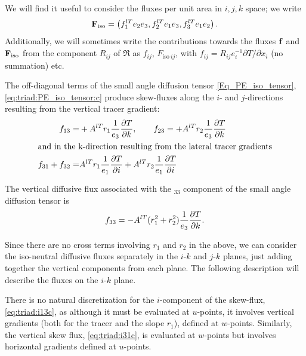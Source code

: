 We will find it useful to consider the fluxes per unit area in $i,j,k$
space; we write
\begin{equation}
  \label{eq:triad:Fijk}
  \mathbf{F}_{\mathrm{iso}}=\left(f_1^{lT}e_2e_3, f_2^{lT}e_1e_3, f_3^{lT}e_1e_2\right).
\end{equation}
Additionally, we will sometimes write the contributions towards the
fluxes $\mathbf{f}$ and $\mathbf{F}_\mathrm{iso}$ from the component
$R_{ij}$ of $\Re$ as $f_{ij}$, $F_{\mathrm{iso}\: ij}$, with
$f_{ij}=R_{ij}e_i^{-1}\partial T/\partial x_i$ (no summation) etc.

The off-diagonal terms of the small angle diffusion tensor
\eqref{Eq_PE_iso_tensor}, \eqref{eq:triad:PE_iso_tensor:c} produce skew-fluxes along the
$i$- and $j$-directions resulting from the vertical tracer gradient:
\begin{align}
  \label{eq:triad:i13c}
  f_{13}=&+{A^{lT}} r_1\frac{1}{e_3}\frac{\partial T}{\partial k},\qquad f_{23}=+{A^{lT}} r_2\frac{1}{e_3}\frac{\partial T}{\partial k}\\
\intertext{and in the k-direction resulting from the lateral tracer gradients}
  \label{eq:triad:i31c}
 f_{31}+f_{32}=& {A^{lT}} r_1\frac{1}{e_1}\frac{\partial T}{\partial i}+{A^{lT}} r_2\frac{1}{e_1}\frac{\partial T}{\partial i}
\end{align}

The vertical diffusive flux associated with the $_{33}$
component of the small angle diffusion tensor is
\begin{equation}
  \label{eq:triad:i33c}
  f_{33}=-{A^{lT}}(r_1^2 +r_2^2) \frac{1}{e_3}\frac{\partial T}{\partial k}.
\end{equation}

Since there are no cross terms involving $r_1$ and $r_2$ in the above, we can
consider the iso-neutral diffusive fluxes separately in the $i$-$k$ and $j$-$k$
planes, just adding together the vertical components from each
plane. The following description will describe the fluxes on the $i$-$k$
plane.

There is no natural discretization for the $i$-component of the
skew-flux, \eqref{eq:triad:i13c}, as
although it must be evaluated at $u$-points, it involves vertical
gradients (both for the tracer and the slope $r_1$), defined at
$w$-points. Similarly, the vertical skew flux, \eqref{eq:triad:i31c}, is evaluated at
$w$-points but involves horizontal gradients defined at $u$-points.

